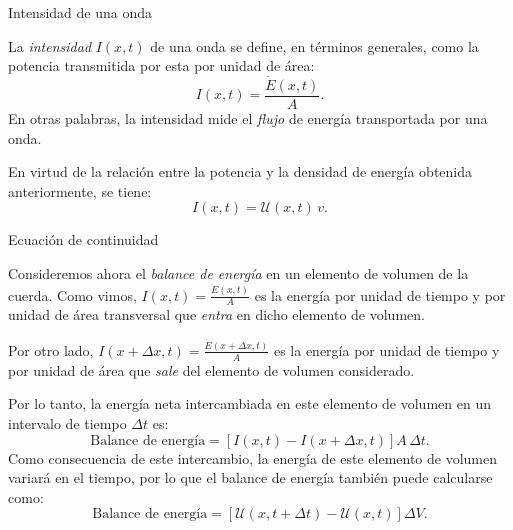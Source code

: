 \documentclass[11pt,handout,aspectratio=1610]{beamer}
\newcommand{\vs}{\vspace{11pt}}
\begin{document}
\begin{frame}{Intensidad de una onda}
    
    La \emph{intensidad} $I \left(x,t\right)$ de una onda se define, en términos generales, como la potencia transmitida por esta por unidad de área: $$ I \left(x,t\right) = \frac{\dot{E} \left(x,t\right)}{A}. $$ En otras palabras, la intensidad mide el \emph{flujo} de energía transportada por una onda. 
    
    \vs

    En virtud de la relación entre la potencia y la densidad de energía obtenida anteriormente, se tiene: $$ I \left(x,t\right) = \mathcal{U} \left(x,t\right)\, v. $$

\end{frame}

\begin{frame}{Ecuación de continuidad}

    Consideremos ahora el \emph{balance de energía} en un elemento de volumen de la cuerda. Como vimos, $ I(x,t) = \frac{\dot{E} (x,t)}{A} $ es la energía por unidad de tiempo y por unidad de área transversal que \emph{entra} en dicho elemento de volumen.

    \vs 

    Por otro lado, $ I\left(x + \Delta x,t\right) = \frac{\dot{E} \left(x + \Delta x,t\right)}{A} $ es la energía por unidad de tiempo y por unidad de área que \emph{sale} del elemento de volumen considerado.

    \vs

    Por lo tanto, la energía neta intercambiada en este elemento de volumen en un intervalo de tiempo $\Delta t$ es: $$ \text{Balance de energía} = \left[I\left(x,t\right) - I \left(x + \Delta x, t\right)\right] A \, \Delta t. $$ Como consecuencia de este intercambio, la energía de este elemento de volumen variará en el tiempo, por lo que el balance de energía también puede calcularse como: $$ \text{Balance de energía} = \left[\mathcal{U} \left(x,t + \Delta t\right) - \mathcal{U} \left(x,t\right)\right] \Delta V. $$

\end{frame}
\end{document}

